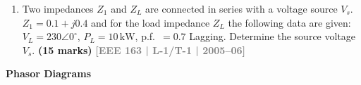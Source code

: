 \documentclass[12pt,a3paper]{article}
\newcommand{\yr}[1]{\hfill\textcolor{gray}{\small\textbf{[#1]}}}
\newcommand{\mk}[1]{\textcolor{orange!70!black}{\small\textbf{(#1 marks)}}}
\newcommand{\subtopic}[2]{%
  \vspace{10pt}
  \noindent\begin{tcolorbox}[colback=#1!8,colframe=#1,boxrule=0.6pt,arc=4pt,
    left=6pt,right=6pt,top=4pt,bottom=4pt]
    \small\bfseries\textcolor{#1}{#2}
  \end{tcolorbox}
  \vspace{2pt}
}
\begin{document}
\begin{enumerate}
\begin{center}

\end{center}
\mk{20} \yr{EEE 163 | L-1/T-1 | 2005--06}

\item Two impedances $Z_1$ and $Z_L$ are connected in series with a voltage source $V_s$. $Z_1 = 0.1 + j0.4$ and for the load impedance $Z_L$ the following data are given: $V_L = 230\angle 0^\circ$, $P_L = 10\,\text{kW}$, p.f.\ $= 0.7$ Lagging. Determine the source voltage $V_s$.
\mk{15} \yr{EEE 163 | L-1/T-1 | 2005--06}

\end{enumerate}

\subtopic{cB}{Phasor Diagrams}
\label{sub:s2-phasor}
\end{document}
